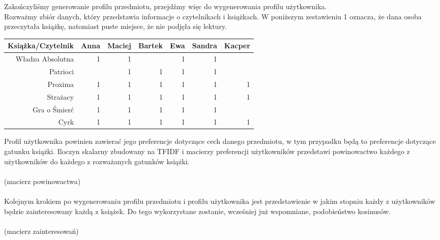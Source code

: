 \documentclass[12pt,a4paper]{report}
\begin{document}
\normalsize{
Zakończyliśmy generowanie profilu przedmiotu, przejdźmy więc do wygenerowania profilu użytkownika. 
\\Rozważmy zbiór danych, który przedstawia informacje o czytelnikach i książkach. W poniższym zestawieniu 1 oznacza, że dana osoba przeczytała książkę, natomiast puste miejsce, że nie podjęła się lektury.
\begin{center}
\begin{tabular}{|r|r|r|r|r|r|r|} \hline
Książka/Czytelnik & Anna & Maciej & Bartek & Ewa & Sandra & Kacper \\
\hline \hline 
Władza Absolutna & 1 & 1 & & 1 & 1 &  \\
Patrioci &  & 1 & 1 & 1 & 1 &  \\
Proxima & 1 & 1 & 1 & 1 & 1 & 1 \\
Strażacy & 1 & 1 & 1 & 1 & 1 & 1 \\
Gra o Śmierć & 1 & 1 & 1 & 1 & 1 &  \\
Cyrk & 1 & 1 & 1 & 1 & 1 & 1 \\
\hline
\end{tabular}
\end{center}
Profil użytkownika powinien zawierać jego preferencje dotyczące cech danego przedmiotu, w tym przypadku będą to preferencje dotyczące gatunku książki. Iloczyn skalarny zbudowany na TFIDF i macierzy preferencji użytkowników przedstawi powinowactwo każdego z użytkowników do każdego z rozważanych gatunków książki. 
\\
\\(macierz powinowactwa)
\\
\\Kolejnym krokiem po wygenerowaniu profilu przedmiotu i profilu użytkownika jest przedstawienie w jakim stopniu każdy z użytkowników będzie zainteresowany każdą z książek. Do tego wykorzystane zostanie, wcześniej już wspomniane, podobieństwo kosinusów.
\\
\\(macierz zainteresowań)
\\

}
\end{document}
